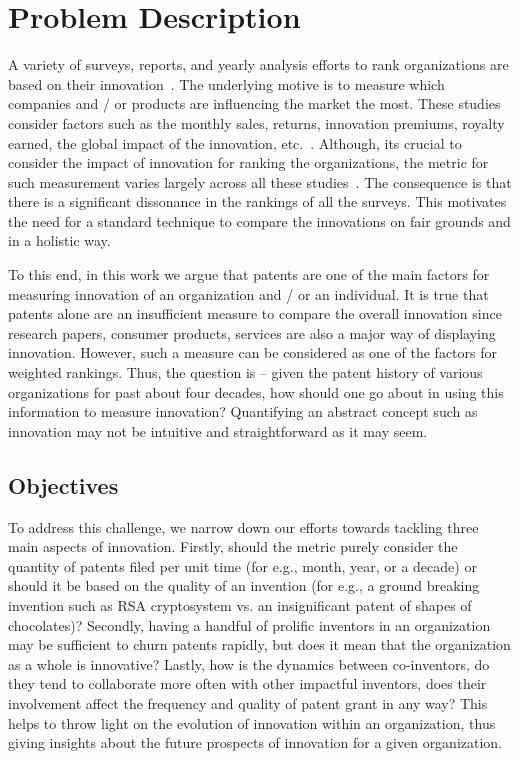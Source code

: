 \section{Problem Description}
\label{sec:prob}

A variety of surveys, reports, and yearly analysis efforts to rank
organizations are based on their innovation~\cite{247wallst, top100}. The underlying motive is to measure
which companies and / or products are influencing the market the most.  These
studies consider factors such as the monthly sales, returns, innovation
premiums, royalty earned, the global impact of the innovation, etc.~\cite{forbeshow}. Although,
its crucial to consider the impact of innovation for ranking the
organizations, the metric for such measurement  varies largely across all these 
studies~\cite{reuters-method}. The consequence is that there is a significant dissonance in the
rankings of all the surveys.  This motivates the need for a standard technique
to compare the innovations on fair grounds and in a holistic way. 

To this end, in this work we argue that patents are one of the main factors for
measuring innovation of an organization and / or an individual. It is true
that patents alone are an insufficient measure to compare the overall
innovation since research papers, consumer products, services are also a major
way of displaying innovation. However, such a measure can be considered as one
of the factors for weighted rankings. Thus, the question is -- given the patent history of
various organizations for past about four decades,  how should one go about in
using this information to measure innovation? Quantifying an abstract
concept such as innovation may not be intuitive and straightforward as it may seem.  

\subsection{Objectives}

To address this challenge, we narrow down our efforts towards tackling
three main  aspects of innovation. Firstly, should the metric purely consider
the quantity of patents filed per unit time (for e.g., month, year, or a
decade) or should it be based on the quality of an invention (for e.g., a
ground breaking invention such as RSA cryptosystem vs. an insignificant patent
of shapes of chocolates)? Secondly, having a handful of prolific inventors in
an organization may be sufficient to churn patents rapidly, but does it mean
that the organization as a whole is innovative? Lastly, how is the dynamics
between co-inventors, do they tend to collaborate more often with other
impactful inventors, does their involvement affect the frequency and quality 
of patent grant in any way? This helps to throw light on the evolution of 
innovation within an organization, thus giving insights about the future 
prospects of innovation for a given organization.

